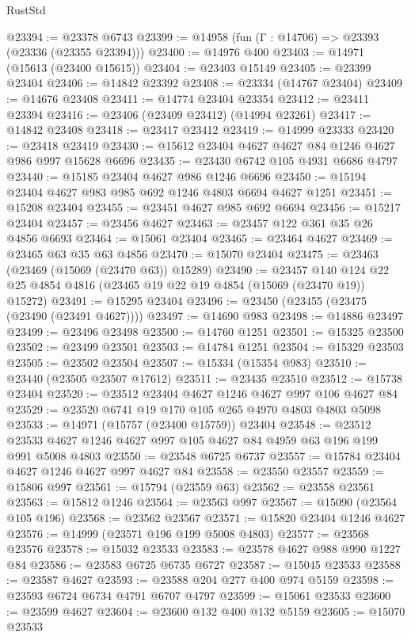 \begin{lexlean}{RustStd}
\begin{coremodule}
@23394 := @23378 @6743
@23399 := @14958 (fun (Γ : @14706) => @23393 (@23336 (@23355 @23394)))
@23400 := @14976 @400
@23403 := @14971 (@15613 (@23400 @15615))
@23404 := @23403 @15149
@23405 := @23399 @23404
@23406 := @14842 @23392
@23408 := @23334 (@14767 @23404)
@23409 := @14676 @23408
@23411 := @14774 @23404 @23354
@23412 := @23411 @23394
@23416 := @23406 (@23409 @23412) (@14994 @23261)
@23417 := @14842 @23408
@23418 := @23417 @23412
@23419 := @14999 @23333
@23420 := @23418 @23419
@23430 := @15612 @23404 @4627 @4627 @84 @1246 @4627 @986 @997 @15628 @6696
@23435 := @23430 @6742 @105 @4931 @6686 @4797
@23440 := @15185 @23404 @4627 @986 @1246 @6696
@23450 := @15194 @23404 @4627 @983 @985 @692 @1246 @4803 @6694 @4627 @1251
@23451 := @15208 @23404
@23455 := @23451 @4627 @985 @692 @6694
@23456 := @15217 @23404
@23457 := @23456 @4627
@23463 := @23457 @122 @361 @35 @26 @4856 @6693
@23464 := @15061 @23404
@23465 := @23464 @4627
@23469 := @23465 @63 @35 @63 @4856
@23470 := @15070 @23404
@23475 := @23463 (@23469 (@15069 (@23470 @63)) @15289)
@23490 := @23457
    @140
    @124
    @22
    @25
    @4854
    @4816
    (@23465 @19 @22 @19 @4854 (@15069 (@23470 @19)) @15272)
@23491 := @15295 @23404
@23496 := @23450 (@23455 (@23475 (@23490 (@23491 @4627))))
@23497 := @14690 @983
@23498 := @14886 @23497
@23499 := @23496 @23498
@23500 := @14760 @1251
@23501 := @15325 @23500
@23502 := @23499 @23501
@23503 := @14784 @1251
@23504 := @15329 @23503
@23505 := @23502 @23504
@23507 := @15334 (@15354 @983)
@23510 := @23440 (@23505 @23507 @17612)
@23511 := @23435 @23510
@23512 := @15738 @23404
@23520 := @23512 @23404 @4627 @1246 @4627 @997 @106 @4627 @84
@23529 := @23520 @6741 @19 @170 @105 @265 @4970 @4803 @4803 @5098
@23533 := @14971 (@15757 (@23400 @15759)) @23404
@23548 := @23512 @23533 @4627 @1246 @4627 @997 @105 @4627 @84 @4959 @63 @196 @199 @991 @5008 @4803
@23550 := @23548 @6725 @6737
@23557 := @15784 @23404 @4627 @1246 @4627 @997 @4627 @84
@23558 := @23550 @23557
@23559 := @15806 @997
@23561 := @15794 (@23559 @63)
@23562 := @23558 @23561
@23563 := @15812 @1246
@23564 := @23563 @997
@23567 := @15090 (@23564 @105 @196)
@23568 := @23562 @23567
@23571 := @15820 @23404 @1246 @4627
@23576 := @14999 (@23571 @196 @199 @5008 @4803)
@23577 := @23568 @23576
@23578 := @15032 @23533
@23583 := @23578 @4627 @988 @990 @1227 @84
@23586 := @23583 @6725 @6735 @6727
@23587 := @15045 @23533
@23588 := @23587 @4627
@23593 := @23588 @204 @277 @400 @974 @5159
@23598 := @23593 @6724 @6734 @4791 @6707 @4797
@23599 := @15061 @23533
@23600 := @23599 @4627
@23604 := @23600 @132 @400 @132 @5159
@23605 := @15070 @23533

\end{coremodule}
\end{lexlean}
